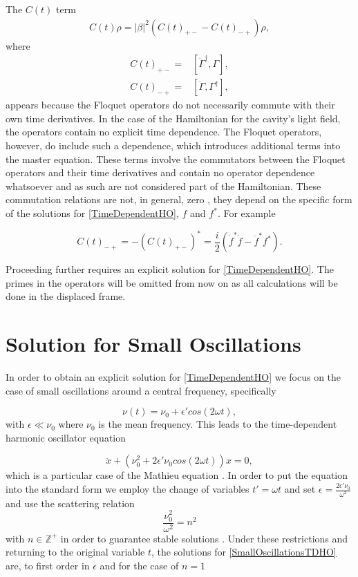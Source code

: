 \documentclass[reprint, amsmath,amssymb, aps,pra]{revtex4-1}
\begin{document}
The $C(t)$ term
 \begin{align}
C(t)\rho = |\beta|^2(C(t)_{+-} - C(t)_{-+})\rho \nonumber,
 \end{align}
 where
\begin{align*}
C(t)_{+-} =& [\dot{\Gamma}^{\dagger}, \Gamma],\\
C(t)_{-+} =& [\dot{\Gamma}, \Gamma^{\dagger}],
\end{align*}
appears because the Floquet operators do not necessarily commute with
their own time derivatives. In the case of the Hamiltonian for the
cavity's light field, the operators contain no explicit time
dependence. The Floquet operators, however,
do include such a dependence, which introduces additional terms into
the master equation. These terms involve the commutators between the
Floquet operators and their time derivatives and contain no operator
dependence whatsoever and as such are not considered part of the
Hamiltonian. These commutation relations are not, in general, zero
\cite{TesisMaestria}, they depend on the specific form of the
solutions for \eqref{TimeDependentHO}, $f$ and $f^*$. For example

\begin{equation}
C(t)_{-+} = -(C(t)_{+-})^* = \frac{i}{2}(\dot{f}^* \dot{f} - \ddot{f}^*f^*).
\end{equation}



Proceeding further requires an explicit solution for
\eqref{TimeDependentHO}. The primes in the operators will be omitted
from now on as all calculations will be done in the displaced frame.


\section{Solution for Small Oscillations}\label{SolSmallOsc}
 
 In order to obtain an explicit solution for \eqref{TimeDependentHO} we focus on the case of small oscillations around a central frequency, specifically

\begin{equation}\label{SmallOscillationsTDHO}
\nu(t) = \nu_0 + \epsilon' cos(2\omega t),
\end{equation} with $\epsilon \ll \nu_0$ where $\nu_0$ is the mean frequency. This leads to the time-dependent harmonic oscillator equation

\begin{equation}
\ddot{x} + (\nu_0^2 + 2\epsilon' \nu_0 cos(2\omega t))x = 0,
\end{equation}
which is a particular case of the Mathieu equation \cite{PiatekME}. In
order to put the equation into the standard form we employ the change
of variables $t'= \omega t$ and set
$\epsilon = \frac{2\epsilon' \nu_0}{\omega^2}$ and use the scattering
relation
\begin{equation}
\frac{\nu_0^2}{\omega^2} = n^2\label{scattering}
\end{equation}
with $n \in \mathbb{Z}^+$ in order to guarantee stable solutions
\cite{WardFT}. Under these restrictions and returning to the original
variable $t$, the solutions for \eqref{SmallOscillationsTDHO} are, to
first order in $\epsilon$ and for the case of $n=1$
\end{document}
